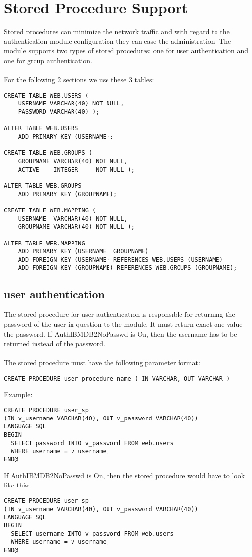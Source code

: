 \documentclass[11pt,letterpaper]{scrartcl}
\def\tt{\normalfont\ttfamily}
\begin{document}
\begin{appendix}
\hypertarget{hsps}{}
\section{Stored Procedure Support} \label{sp}
Stored procedures can minimize the network traffic and with regard to the authentication module configuration they can ease the administration. The module supports two types of stored procedures: one for user authentication and one for group authentication.\\
\\
For the following 2 sections we use these 3 tables:
\\
\begin{verbatim}
CREATE TABLE WEB.USERS (
    USERNAME VARCHAR(40) NOT NULL,
    PASSWORD VARCHAR(40) );

ALTER TABLE WEB.USERS
    ADD PRIMARY KEY (USERNAME);

CREATE TABLE WEB.GROUPS (
    GROUPNAME VARCHAR(40) NOT NULL,
    ACTIVE    INTEGER     NOT NULL );

ALTER TABLE WEB.GROUPS
    ADD PRIMARY KEY (GROUPNAME);

CREATE TABLE WEB.MAPPING (
    USERNAME  VARCHAR(40) NOT NULL,
    GROUPNAME VARCHAR(40) NOT NULL );

ALTER TABLE WEB.MAPPING
    ADD PRIMARY KEY (USERNAME, GROUPNAME)
    ADD FOREIGN KEY (USERNAME) REFERENCES WEB.USERS (USERNAME)
    ADD FOREIGN KEY (GROUPNAME) REFERENCES WEB.GROUPS (GROUPNAME);
\end{verbatim}
\newpage
\hypertarget{husersp}{}
\subsection{user authentication} \label{usersp}
The stored procedure for user authentication is responsible for returning the password of the user in question to the module. It must return exact one value - the password. If {\tt AuthIBMDB2NoPasswd} is {\tt On}, then the username has to be returned instead of the password.\\
\\
The stored procedure must have the following parameter format:
\begin{verbatim}
CREATE PROCEDURE user_procedure_name ( IN VARCHAR, OUT VARCHAR )
\end{verbatim}
Example:
\begin{verbatim}
CREATE PROCEDURE user_sp
(IN v_username VARCHAR(40), OUT v_password VARCHAR(40))
LANGUAGE SQL
BEGIN
  SELECT password INTO v_password FROM web.users
  WHERE username = v_username;
END@
\end{verbatim}
If {\tt AuthIBMDB2NoPasswd} is {\tt On}, then the stored procedure would have to look like this:
\begin{verbatim}
CREATE PROCEDURE user_sp
(IN v_username VARCHAR(40), OUT v_password VARCHAR(40))
LANGUAGE SQL
BEGIN
  SELECT username INTO v_password FROM web.users
  WHERE username = v_username;
END@
\end{verbatim}
\newpage
\hypertarget{hgroupsp}{}

\end{appendix}
\end{document}
